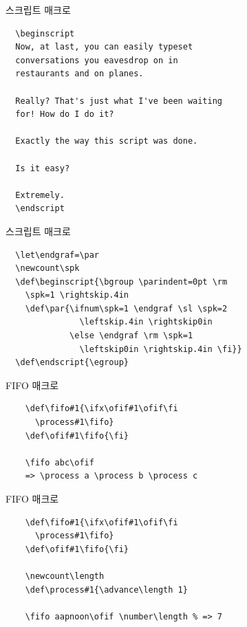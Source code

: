 \documentclass{beamer}
\begin{document}
%
\begin{frame}[fragile]{스크립트 매크로}
\begin{verbatim}
  \beginscript
  Now, at last, you can easily typeset
  conversations you eavesdrop on in
  restaurants and on planes.
  
  Really? That's just what I've been waiting
  for! How do I do it?
  
  Exactly the way this script was done.
  
  Is it easy?
  
  Extremely.
  \endscript
\end{verbatim}
\end{frame}


%
\begin{frame}[fragile]{스크립트 매크로}
\begin{verbatim}
  \let\endgraf=\par
  \newcount\spk
  \def\beginscript{\bgroup \parindent=0pt \rm
    \spk=1 \rightskip.4in
    \def\par{\ifnum\spk=1 \endgraf \sl \spk=2
               \leftskip.4in \rightskip0in
             \else \endgraf \rm \spk=1
               \leftskip0in \rightskip.4in \fi}}
  \def\endscript{\egroup}
\end{verbatim}
\end{frame}


%
\begin{frame}[fragile]{FIFO 매크로}
\begin{verbatim}
    \def\fifo#1{\ifx\ofif#1\ofif\fi
      \process#1\fifo}
    \def\ofif#1\fifo{\fi}

    \fifo abc\ofif
    => \process a \process b \process c
\end{verbatim}
\end{frame}


%
\begin{frame}[fragile]{FIFO 매크로}
\begin{verbatim}
    \def\fifo#1{\ifx\ofif#1\ofif\fi
      \process#1\fifo}
    \def\ofif#1\fifo{\fi}

    \newcount\length
    \def\process#1{\advance\length 1}

    \fifo aapnoon\ofif \number\length % => 7
\end{verbatim}
\end{frame}
\end{document}
